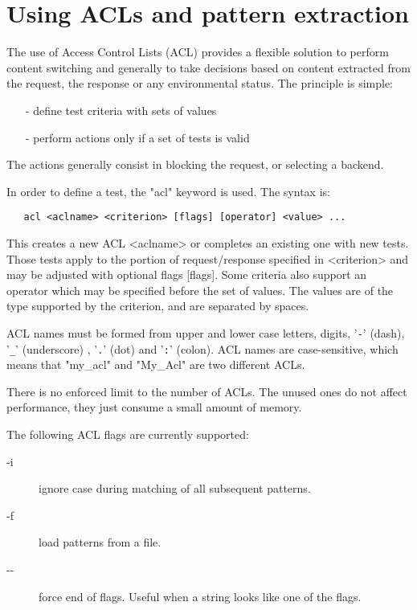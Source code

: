 \chapter{Using ACLs and pattern extraction}
\label{chap:using_acl}

The use of Access Control Lists (ACL) provides a flexible solution to perform
content switching and generally to take decisions based on content extracted
from the request, the response or any environmental status. The principle is
simple:

\begin{itemize}
\item[-] define test criteria with sets of values
\item[-] perform actions only if a set of tests is valid
\end{itemize}

The actions generally consist in blocking the request, or selecting a backend.

In order to define a test, the "acl" keyword is used. The syntax is:

\begin{verbatim}
   acl <aclname> <criterion> [flags] [operator] <value> ...
\end{verbatim}

This creates a new ACL <aclname> or completes an existing one with new tests.
Those tests apply to the portion of request/response specified in <criterion>
and may be adjusted with optional flags [flags]. Some criteria also support
an operator which may be specified before the set of values. The values are
of the type supported by the criterion, and are separated by spaces.

ACL names must be formed from upper and lower case letters, digits, '\verb|-|' (dash),
'\verb|_|' (underscore) , '\verb|.|' (dot) and '\verb|:|' (colon). ACL names are case-sensitive,
which means that "my\_acl" and "My\_Acl" are two different ACLs.

There is no enforced limit to the number of ACLs. The unused ones do not affect
performance, they just consume a small amount of memory.

The following ACL flags are currently supported:

\begin{description}
\item[-i] ignore case during matching of all subsequent patterns.
\item[-f] load patterns from a file.
\item[{-}{-}] force end of flags. Useful when a string looks like one of the flags.
\end{description}


